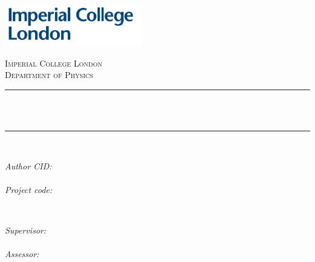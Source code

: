 \begin{titlepage}

\newcommand{\HRule}{\rule{\linewidth}{0.5mm}} %



\includegraphics[width = 6cm]{./imperial}\\[0.5cm] 

\center %


\textsc{\Large Imperial College London}\\[0.5cm] 
\textsc{\large Department of Physics}\\[0.5cm] 


\HRule \\[0.4cm]
{ \huge \bfseries \reporttitle}\\ %
\HRule \\[1.5cm]
 

\begin{minipage}{0.4\textwidth}
\begin{flushleft} \large
\emph{Author CID:}\\
\CID\\
\vspace*{1em}
\emph{Project code:}\\
\projectcode
\end{flushleft}
\end{minipage}
~
\begin{minipage}{0.4\textwidth}
\begin{flushright} \large
\emph{Supervisor:} \\
\supervisor\\ %
\vspace*{1em}
\emph{Assessor:}\\
\assessor
\end{flushright}
\end{minipage}\\[4cm]


\end{titlepage}
